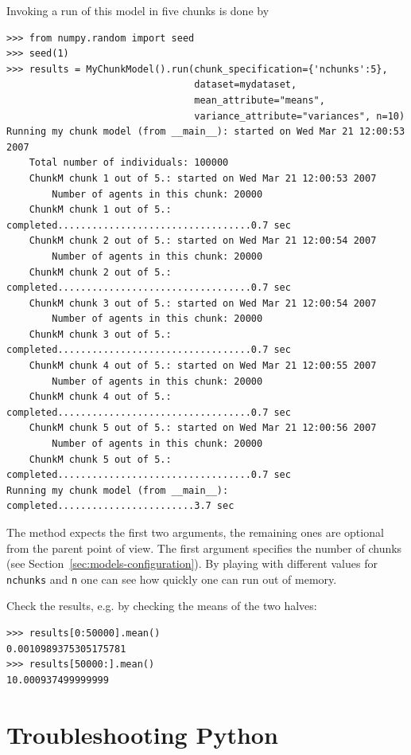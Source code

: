 Invoking a run of this model in five chunks is done by
\attributesindex
\begin{verbatim}
>>> from numpy.random import seed
>>> seed(1)
>>> results = MyChunkModel().run(chunk_specification={'nchunks':5},
                                 dataset=mydataset,
                                 mean_attribute="means",
                                 variance_attribute="variances", n=10)
Running my chunk model (from __main__): started on Wed Mar 21 12:00:53 2007
    Total number of individuals: 100000
    ChunkM chunk 1 out of 5.: started on Wed Mar 21 12:00:53 2007
        Number of agents in this chunk: 20000
    ChunkM chunk 1 out of 5.: completed..................................0.7 sec
    ChunkM chunk 2 out of 5.: started on Wed Mar 21 12:00:54 2007
        Number of agents in this chunk: 20000
    ChunkM chunk 2 out of 5.: completed..................................0.7 sec
    ChunkM chunk 3 out of 5.: started on Wed Mar 21 12:00:54 2007
        Number of agents in this chunk: 20000
    ChunkM chunk 3 out of 5.: completed..................................0.7 sec
    ChunkM chunk 4 out of 5.: started on Wed Mar 21 12:00:55 2007
        Number of agents in this chunk: 20000
    ChunkM chunk 4 out of 5.: completed..................................0.7 sec
    ChunkM chunk 5 out of 5.: started on Wed Mar 21 12:00:56 2007
        Number of agents in this chunk: 20000
    ChunkM chunk 5 out of 5.: completed..................................0.7 sec
Running my chunk model (from __main__): completed........................3.7 sec
\end{verbatim}
The  method expects the first two arguments, the remaining ones are optional
from the parent point of view. The first argument specifies the number of chunks (see
Section~\ref{sec:models-configuration}). By playing with different values for \verb|nchunks| and
\verb|n| one can see how quickly one can run out of memory. 

Check the results, e.g. by checking the means of the two halves:
\begin{verbatim}
>>> results[0:50000].mean()
0.0010989375305175781
>>> results[50000:].mean()
10.000937499999999
\end{verbatim}

\section{Troubleshooting Python}
\label{sec:troubleshooting-python}

